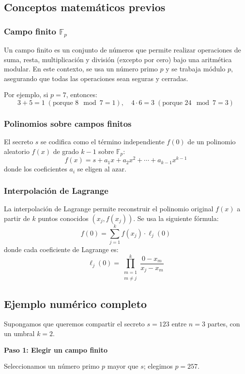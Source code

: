 \documentclass{article}
\begin{document}
\subsection{Conceptos matemáticos previos}

\subsubsection{Campo finito \( \mathbb{F}_p \)}
Un campo finito es un conjunto de números que permite realizar operaciones de suma, resta, multiplicación y división (excepto por cero) bajo una aritmética modular. En este contexto, se usa un número primo \( p \) y se trabaja módulo \( p \), asegurando que todas las operaciones sean seguras y cerradas.

Por ejemplo, si \( p = 7 \), entonces:
\[
3 + 5 = 1 \; (\text{porque } 8 \mod 7 = 1), \quad 4 \cdot 6 = 3 \; (\text{porque } 24 \mod 7 = 3)
\]

\subsubsection{Polinomios sobre campos finitos}
El secreto \( s \) se codifica como el término independiente \( f(0) \) de un polinomio aleatorio \( f(x) \) de grado \( k-1 \) sobre \( \mathbb{F}_p \):
\[
f(x) = s + a_1 x + a_2 x^2 + \cdots + a_{k-1} x^{k-1}
\]
donde los coeficientes \( a_i \) se eligen al azar.

\subsubsection{Interpolación de Lagrange}
La interpolación de Lagrange permite reconstruir el polinomio original \( f(x) \) a partir de \( k \) puntos conocidos \( (x_j, f(x_j)) \). Se usa la siguiente fórmula:
\[
f(0) = \sum_{j=1}^{k} f(x_j) \cdot \ell_j(0)
\]
donde cada coeficiente de Lagrange es:
\[
\ell_j(0) = \prod_{\substack{m=1 \\ m \neq j}}^{k} \frac{0 - x_m}{x_j - x_m}
\]

\subsection{Ejemplo numérico completo}

Supongamos que queremos compartir el secreto \( s = 123 \) entre \( n = 3 \) partes, con un umbral \( k = 2 \).

\textbf{Paso 1: Elegir un campo finito}

Seleccionamos un número primo \( p \) mayor que \( s \); elegimos \( p = 257 \).
\end{document}
